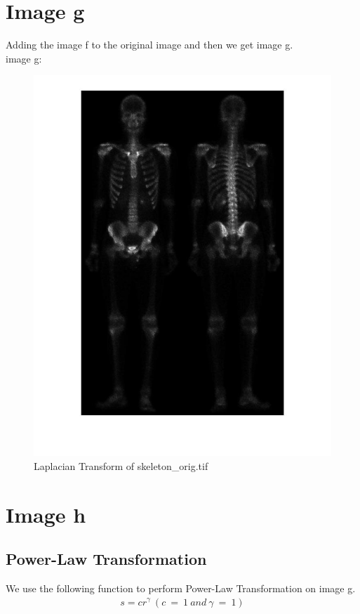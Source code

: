 \documentclass[11pt,oneside]{book}
\begin{document}
\section{Image g}
Adding the image f to the original image and then we get image g.\\
image g:
\begin{figure}[!htb]
   \centering  
   \includegraphics[width=1.0\textwidth]{images/2/g.jpg}
   \caption{Laplacian Transform of skeleton\_orig.tif}  
\end{figure}

\section{Image h}
\subsection{Power-Law Transformation}
We use the following function to perform Power-Law Transformation on image g.
\begin{align}
s=cr^{\gamma}\ (c\ =\ 1\ and\ \gamma \ =\ 1)
\end{align}
\end{document}
